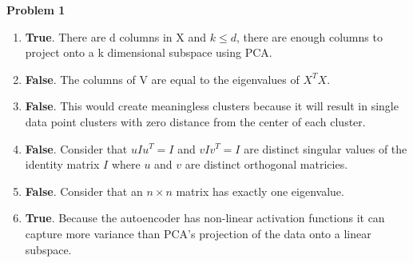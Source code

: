 {\bf Problem 1}
\begin{enumerate}
    \item {\bf True}. There are d columns in X and $k \leq d$, there are enough columns to project onto a k dimensional subspace using PCA.
    \item {\bf False}. The columns of V are equal to the eigenvalues of $X^TX$.
    \item {\bf False}. This would create meaningless clusters because it will result in single data point clusters with zero distance from the center of each cluster.
    \item {\bf False}. Consider that $uIu^T=I$ and $vIv^T=I$ are distinct singular values of the identity matrix $I$ where $u$ and $v$ are distinct orthogonal matricies. 
    \item {\bf False}. Consider that an $n \times n$ matrix has exactly one eigenvalue.
    \item {\bf True}. Because the autoencoder has non-linear activation functions it can capture more variance than PCA's projection of the data onto a linear subspace.
\end{enumerate}
